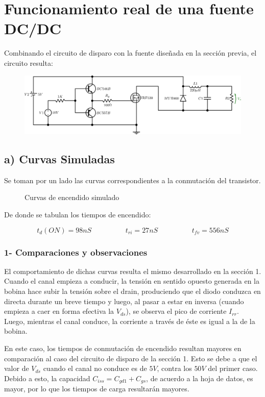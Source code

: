 \documentclass[e4_tp1_main.tex]{subfiles}
\begin{document}
\section{Funcionamiento real de una fuente DC/DC}

Combinando el circuito de disparo con la fuente diseñada en la sección previa, el circuito resulta:

\begin{figure}[H]
\centering
\includegraphics[width=1\linewidth]{Imagenes/Punto3/Circuito3.png}
\end{figure}

\subsection*{a) Curvas Simuladas}

Se toman por un lado las curvas correspondientes a la conmutación del transistor.

\begin{figure}[H]
\centering
\caption{Curvas de encendido simulado}
\end{figure}

De donde se tabulan los tiempos de encendido:

\[
t_d(ON) = 98nS \hspace{2cm} t_{ri} = 27nS \hspace{2cm} t_{fv} = 556nS
\]

\subsubsection*{1- Comparaciones y observaciones}

El comportamiento de dichas curvas resulta el mismo desarrollado en la sección 1. Cuando el canal empieza a conducir, la tensión en sentido opuesto generada en la bobina hace subir la tensión sobre el drain, produciendo que el diodo conduzca en directa durante un breve tiempo y luego, al pasar a estar en inversa (cuando empieza a caer en forma efectiva la $V_{ds}$), se observa el pico de corriente $I_{rr}$. Luego, mientras el canal conduce, la corriente a través de éste es igual a la de la bobina.\par
En este caso, los tiempos de conmutación de encendido resultan mayores en comparación al caso del circuito de disparo de la sección 1. Esto se debe a que el valor de $V_{ds}$ cuando el canal no conduce es de $5V$, contra los $50V$ del primer caso. Debido a esto, la capacidad $C_{iss} = C_{gd1} + C_{gs}$, de acuerdo a la hoja de datos, es mayor, por lo que los tiempos de carga resultarán mayores.
\end{document}
